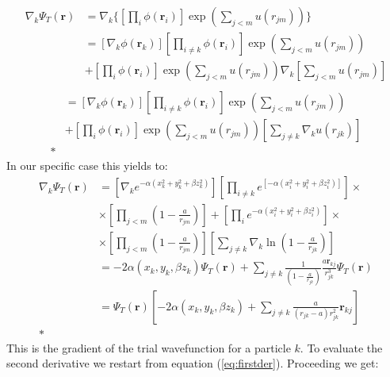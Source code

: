 \begin{align*}
    \nabla_k\Psi_T(\mathbf{r}) &= \nabla_k \bigg\{ \left[ \prod_i \phi(\mathbf{r}_i) \right] \exp{\left(\sum_{j<m}u(r_{jm})\right)} \bigg\} \\
    &= \left[ \nabla_k \phi(\mathbf{r}_k) \right] \left[ \prod_{i \neq k} \phi(\mathbf{r}_i) \right] \exp{\left(\sum_{j<m}u(r_{jm})\right)} \\ &+ \left[\prod_i \phi(\mathbf{r}_i)  \right] \exp{\left(\sum_{j<m} u(r_{jm}) \right)} \nabla_k \left[ \sum_{j<m} u(r_{jm}) \right] \\
\end{align*}
\begin{align}
    &= \left[ \nabla_k \phi(\mathbf{r}_k) \right] \left[ \prod_{i \neq k} \phi(\mathbf{r}_i) \right] \exp{\left(\sum_{j<m}u(r_{jm})\right)} \nonumber\\
    &+ \left[\prod_i \phi(\mathbf{r}_i) \right] \exp{\left(\sum_{j<m} u(r_{jm}) \right)} \left[ \sum_{j\neq k} \nabla_k u(r_{jk}) \right]\nonumber\\*
    \label{eq:firstder}
\end{align}
In our specific case this yields to: 
\begin{align}
    \nabla_k\Psi_T(\mathbf{r}) &=\left[ \nabla_k  e^{  -\alpha(x_k^2 + y_k^2 + \beta z_k^2)} \right] \left[ \prod_{i \neq k}  e^{\left[ -\alpha(x_i^2 + y_i^2 + \beta z_i^2) \right]} \right] \times \nonumber\\
    & \times\left[ \prod_{j<m} \left( 1 - \frac{a}{r_{jm}} \right) \right] +  \left[\prod_i e^{ -\alpha (x_i^2 + y_i^2 + \beta z_i^2)} \right] \times \nonumber\\
    &\times \left[\prod_{j<m} \left( 1 - \frac{a}{r_{jm}} \right) \right] \left[ \sum_{j\neq k} \nabla_k \ln \left( 1 - \frac{a}{r_{jk}} \right) \right] \nonumber \\
    &= -2\alpha (x_k, y_k, \beta z_k) \Psi_T(\mathbf{r}) +  \sum_{j\neq k} \frac{1}{\left( 1 - \frac{a}{r_{jk}} \right)} \frac{a \mathbf{r}_{kj}}{r_{jk}^{3}} \Psi_T(\mathbf{r}) \nonumber\\
    &= \Psi_T(\mathbf{r}) \left[ -2\alpha (x_k, y_k, \beta z_k) + \sum_{j\neq k} \frac{a}{\left( r_{jk} - a \right) r_{jk}^2} \mathbf{r}_{kj} \right] \nonumber\\*
\end{align}
This is the gradient of the trial wavefunction for a particle $k$.
To evaluate the second derivative we restart from equation (\ref{eq:firstder}).
Proceeding we get:

